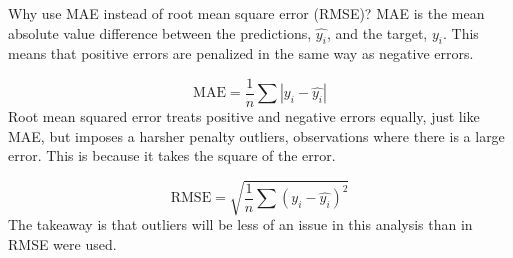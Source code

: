\documentclass[]{article}
\begin{document}
Why use MAE instead of root mean square error (RMSE)? MAE is the mean
absolute value difference between the predictions, \(\hat{y_i}\), and
the target, \(y_i\). This means that positive errors are penalized in
the same way as negative errors.

\[\text{MAE} = \frac{1}{n}\sum{|y_i - \hat{y_i}|}\] Root mean squared
error treats positive and negative errors equally, just like MAE, but
imposes a harsher penalty outliers, observations where there is a large
error. This is because it takes the square of the error.

\[\text{RMSE} = \sqrt{\frac{1}{n}\sum{(y_i - \hat{y_i})^2}}\] The
takeaway is that outliers will be less of an issue in this analysis than
in RMSE were used.
\end{document}
